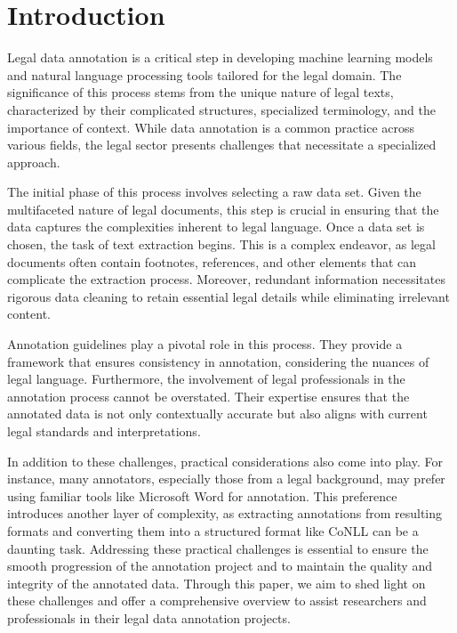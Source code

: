 \documentclass{IOS-Book-Article}
\begin{document}
\section{Introduction}

Legal data annotation is a critical step in developing machine learning models and natural language processing tools tailored for the legal domain. The significance of this process stems from the unique nature of legal texts, characterized by their complicated structures, specialized terminology, and the importance of context. While data annotation is a common practice across various fields, the legal sector presents challenges that necessitate a specialized approach.

The initial phase of this process involves selecting a raw data set. Given the multifaceted nature of legal documents, this step is crucial in ensuring that the data captures the complexities inherent to legal language. Once a data set is chosen, the task of text extraction begins. This is a complex endeavor, as legal documents often contain footnotes, references, and other elements that can complicate the extraction process. Moreover, redundant information necessitates rigorous data cleaning to retain essential legal details while eliminating irrelevant content.

Annotation guidelines play a pivotal role in this process. They provide a framework that ensures consistency in annotation, considering the nuances of legal language. Furthermore, the involvement of legal professionals in the annotation process cannot be overstated. Their expertise ensures that the annotated data is not only contextually accurate but also aligns with current legal standards and interpretations.

In addition to these challenges, practical considerations also come into play. For instance, many annotators, especially those from a legal background, may prefer using familiar tools like Microsoft Word for annotation. This preference introduces another layer of complexity, as extracting annotations from resulting formats and converting them into a structured format like CoNLL can be a daunting task. Addressing these practical challenges is essential to ensure the smooth progression of the annotation project and to maintain the quality and integrity of the annotated data. Through this paper, we aim to shed light on these challenges and offer a comprehensive overview to assist researchers and professionals in their legal data annotation projects.
\end{document}
